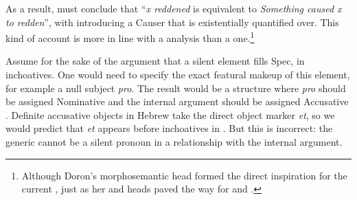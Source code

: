 \begin{exe}
\begin{xlist}
\begin{xlist}
\begin{exe}
\begin{exe}
\begin{xlist}
\begin{exe}
\begin{xlist}
\begin{exe}
\begin{xlist}
\begin{xlist}
\begin{exe}
\begin{xlist}
\begin{exe}
\begin{xlist}
\begin{exe}
\begin{exe}
\begin{exe}
\begin{xlist}
\begin{exe}
\begin{exe}
\begin{xlist}
\begin{xlist}
\begin{exe}
\begin{xlist}
\begin{exe}
\begin{exe}
\begin{exe}
\begin{xlist}
\begin{exe}
\begin{exe}
\begin{xlist}
\begin{exe}
\begin{xlist}
\begin{exe}
\begin{xlist}
\begin{exe}
\begin{xlist}
\begin{exe}
\begin{exe}
\begin{xlist}
\begin{exe}
\begin{exe}
\begin{xlist}
\begin{xlist}
\begin{exe}
\begin{xlist}
\begin{xlist}
\begin{exe}
\begin{xlist}
\begin{exe}
\begin{xlist}
\begin{exe}
\begin{xlist}
\begin{exe}
\begin{xlist}
\begin{exe}
\begin{exe}
\begin{exe}
\begin{exe}
\begin{xlist}
\begin{exe}
\begin{exe}
\begin{xlist}
\begin{xlist}
\begin{exe}
\begin{exe}
\begin{xlist}
\begin{exe}
\begin{xlist}
As a result, \citet[62]{doron03} must conclude that ``\emph{x reddened} is equivalent to \emph{Something caused x to redden}'', with  introducing a Causer that is existentially quantified over. This kind of account is more in line with a  analysis than a  one.\footnote{Although Doron's morphosemantic head formed the direct inspiration for the current {\vd}, just as her  and  heads paved the way for {\vz} and {\va}.}

Assume for the sake of the argument that a silent element fills Spec,{\vd} in inchoatives. One would need to specify the exact featural makeup of this element, for example a null subject \emph{pro}. The result would be a  structure where \emph{pro} should be assigned Nominative  and the internal argument should be assigned Accusative . Definite accusative objects in Hebrew take the direct object marker \emph{et}, so we would predict that \emph{et} appears before inchoatives in \thif. But this is incorrect: the generic  cannot be a silent pronoun in a  relationship with the internal argument.
 \begin{exe}
 \ex  
 \begin{xlist} 
	

\end{xlist}
\end{exe}
\end{xlist}
\end{exe}
\end{xlist}
\end{exe}
\end{exe}
\end{xlist}
\end{xlist}
\end{exe}
\end{exe}
\end{xlist}
\end{exe}
\end{exe}
\end{exe}
\end{exe}
\end{xlist}
\end{exe}
\end{xlist}
\end{exe}
\end{xlist}
\end{exe}
\end{xlist}
\end{exe}
\end{xlist}
\end{xlist}
\end{exe}
\end{xlist}
\end{xlist}
\end{exe}
\end{exe}
\end{xlist}
\end{exe}
\end{exe}
\end{xlist}
\end{exe}
\end{xlist}
\end{exe}
\end{xlist}
\end{exe}
\end{xlist}
\end{exe}
\end{exe}
\end{xlist}
\end{exe}
\end{exe}
\end{exe}
\end{xlist}
\end{exe}
\end{xlist}
\end{xlist}
\end{exe}
\end{exe}
\end{xlist}
\end{exe}
\end{exe}
\end{exe}
\end{xlist}
\end{exe}
\end{xlist}
\end{exe}
\end{xlist}
\end{xlist}
\end{exe}
\end{xlist}
\end{exe}
\end{xlist}
\end{exe}
\end{exe}
\end{xlist}
\end{xlist}
\end{exe}
